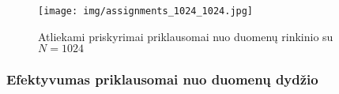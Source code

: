 \documentclass{VUMIFInfBakalaurinis}
\begin{document}
\begin{figure}[H]
  \centering
  \texttt{[image: img/assignments\_1024\_1024.jpg]}
  \caption{Atliekami priskyrimai priklausomai nuo duomenų rinkinio su $N = 1024$}
  \label{img:assignments_1024_1024}
\end{figure}

\pagebreak

\subsubsection{Efektyvumas priklausomai nuo duomenų dydžio}




\end{document}
